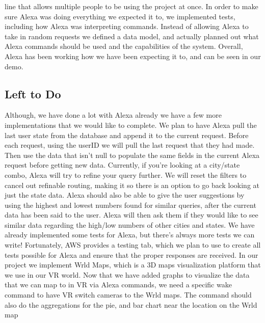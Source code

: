 \documentclass[onecolumn, draftclsnofoot,10pt, compsoc]{IEEEtran}
\begin{document}
line that allows multiple people to be using the project at once. In order to make sure Alexa was doing everything we expected it to, we implemented tests, including how Alexa was interpreting commands. Instead of allowing Alexa to take in random requests we defined a data model, and actually planned out what Alexa commands should be used and the capabilities of the system. Overall, Alexa has been working how we have been expecting it to, and can be seen in our demo.


    \subsection{Left to Do}
    Although, we have done a lot with Alexa already we have a few more implementations that we would like to complete. We plan to have Alexa pull the last user state from the database and append it to the current request. Before each request, using the userID we will pull the last request that they had made. Then use the data that isn't null to populate the same fields in the current Alexa request before getting new data. Currently, if you're looking at a city/state combo, Alexa will try to refine your query further. We will reset the filters to cancel out refinable routing, making it so there is an option to go back looking at just the state data. Alexa should also be able to give the user suggestions by using the highest and lowest numbers found for similar queries, after the current data has been said to the user. Alexa will then ask them if they would like to see similar data regarding the high/low numbers of other cities and states. We have already implemented some tests for Alexa, but there’s always more tests we can write! Fortunately, AWS provides a testing tab, which we plan to use to create all tests possible for Alexa and ensure that the proper responses are received. In our project we implement Wrld Maps, which is a 3D maps visualization platform that we use in our VR world. Now that we have added graphs to visualize the data that we can map to in VR via Alexa commands, we need a specific wake command to have VR switch cameras to the Wrld maps. The command should also do the aggregations for the pie, and bar chart near the location on the Wrld map
\end{document}
